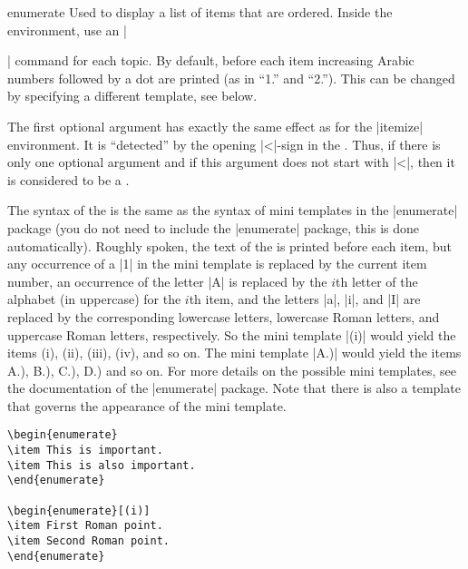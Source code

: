 \begin{environment}{{enumerate}}
  Used to display a list of items that are ordered.  Inside the
  environment, use an |\item| command for each topic. By default,
  before each item increasing Arabic numbers  followed by a dot are
  printed (as in ``1.'' and ``2.''). This can be changed by specifying
  a different template,  see below.

  The first optional argument  has
  exactly the same effect as for the |itemize| environment. It is
  ``detected'' by the opening |<|-sign in the . Thus, if there is only one optional argument and
  if this argument does not start with |<|, then it is considered to
  be a .

  The syntax of the  is the same as
  the syntax of mini templates in the |enumerate| package (you do not
  need to include the
  |enumerate| package, this is done automatically). Roughly spoken,
  the text of the  is printed before each item,
  but any occurrence of a |1| in the mini template is replaced by the
  current item number, an occurrence of the letter |A| is replaced by
  the $i$th letter of the alphabet (in uppercase) for the $i$th item,
  and the letters |a|, |i|, and |I| are replaced by the corresponding
  lowercase letters, lowercase Roman letters, and uppercase Roman
  letters, respectively. So the mini template |(i)| would yield the
  items (i), (ii), (iii), (iv), and so on. The mini template |A.)|
  would yield the items A.), B.), C.), D.) and so on. For more details
  on the possible mini templates, see the documentation of the
  |enumerate| package. Note that there is also a template that governs
  the appearance of the mini template.

  \example
\begin{verbatim}
\begin{enumerate}
\item This is important.
\item This is also important.
\end{enumerate}

\begin{enumerate}[(i)]
\item First Roman point.
\item Second Roman point.
\end{enumerate}


\end{verbatim}
\end{environment}
